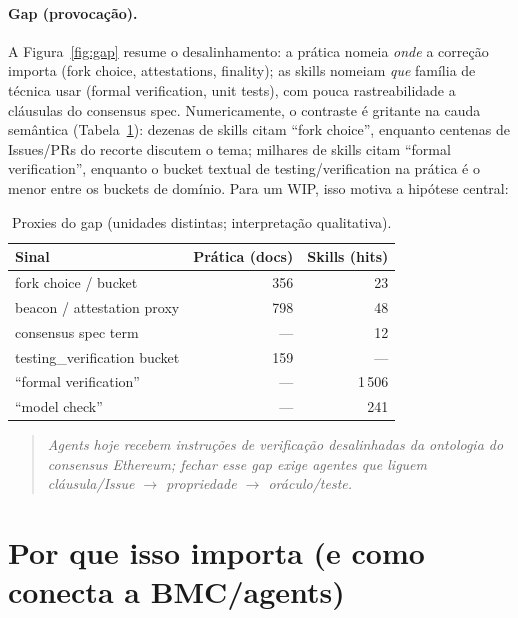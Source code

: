 \documentclass[10pt,conference]{IEEEtran}
\begin{document}
\paragraph{Gap (provocação).}
A Figura~\ref{fig:gap} resume o desalinhamento: a prática nomeia \emph{onde} a correção importa (fork choice, attestations, finality); as skills nomeiam \emph{que} família de técnica usar (formal verification, unit tests), com pouca rastreabilidade a cláusulas do consensus spec. Numericamente, o contraste é gritante na cauda semântica (Tabela~\ref{tab:gap}): dezenas de skills citam ``fork choice'', enquanto centenas de Issues/PRs do recorte discutem o tema; milhares de skills citam ``formal verification'', enquanto o bucket textual de testing/verification na prática é o menor entre os buckets de domínio. Para um WIP, isso motiva a hipótese central:

\begin{table}[t]
\caption{Proxies do gap (unidades distintas; interpretação qualitativa).}
\label{tab:gap}
\centering
\scriptsize
\begin{tabular}{@{}lrr@{}}
\toprule
Sinal & Prática (docs) & Skills (hits) \\
\midrule
fork choice / bucket & 356 & 23 \\
beacon / attestation proxy & 798 & 48 \\
consensus spec term & --- & 12 \\
testing\_verification bucket & 159 & --- \\
``formal verification'' & --- & 1\,506 \\
``model check'' & --- & 241 \\
\bottomrule
\end{tabular}
\end{table}

\begin{quote}
\emph{Agents hoje recebem instruções de verificação desalinhadas da ontologia do consensus Ethereum; fechar esse gap exige agentes que liguem cláusula/Issue $\rightarrow$ propriedade $\rightarrow$ oráculo/teste.}
\end{quote}

\section{Por que isso importa (e como conecta a BMC/agents)}
\end{document}
